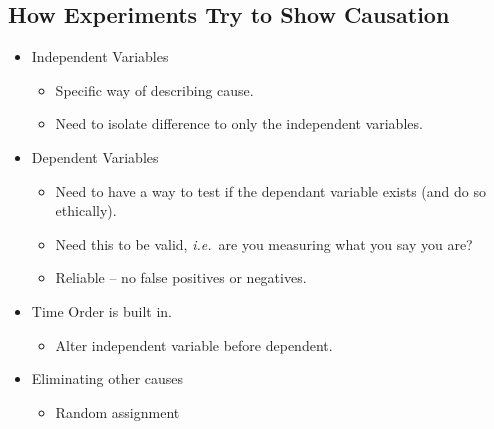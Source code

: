 \documentclass[12pt]{article}
\begin{document}
\subsection*{How Experiments Try to Show Causation}

\begin{itemize}
    \item Independent Variables
        \begin{itemize}
            \item Specific way of describing cause.
            \item Need to isolate difference to only the independent variables.
        \end{itemize}
    \item Dependent Variables
        \begin{itemize}
            \item Need to have a way to test if the dependant variable exists
                (and do so ethically).
            \item Need this to be valid, \textit{i.e.}\ are you measuring what
                you say you are?
            \item Reliable -- no false positives or negatives.
        \end{itemize}
    \item Time Order is built in.
        \begin{itemize}
            \item Alter independent variable before dependent.
        \end{itemize}
    \item Eliminating other causes
        \begin{itemize}
            \item Random assignment
        \end{itemize}
\end{itemize}
\end{document}
